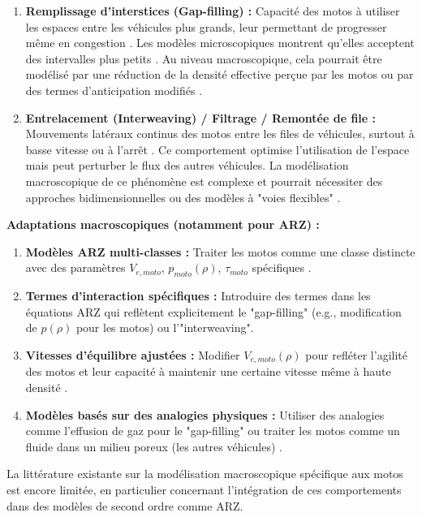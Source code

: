 \begin{enumerate}
    \item \textbf{Remplissage d'interstices (Gap-filling) :} Capacité des motos à utiliser les espaces entre les véhicules plus grands, leur permettant de progresser même en congestion \cite{khan2021macroscopic}. Les modèles microscopiques montrent qu'elles acceptent des intervalles plus petits \cite{NguyenEtAl2012}. Au niveau macroscopique, cela pourrait être modélisé par une réduction de la densité effective perçue par les motos ou par des termes d'anticipation modifiés \cite{khan2021macroscopic}.
    \item \textbf{Entrelacement (Interweaving) / Filtrage / Remontée de file :} Mouvements latéraux continus des motos entre les files de véhicules, surtout à basse vitesse ou à l'arrêt \cite{DiFrancescoEtAl2015, TiwariEtAl2007}. Ce comportement optimise l'utilisation de l'espace mais peut perturber le flux des autres véhicules. La modélisation macroscopique de ce phénomène est complexe et pourrait nécessiter des approches bidimensionnelles ou des modèles à "voies flexibles" \cite{ColomboMarcelliniRossi2023}.
\end{enumerate}

\textbf{Adaptations macroscopiques (notamment pour ARZ) :}

\begin{enumerate}
    \item \textbf{Modèles ARZ multi-classes :} Traiter les motos comme une classe distincte avec des paramètres $V_{e,moto}$, $p_{moto}(\rho)$, $\tau_{moto}$ spécifiques \cite{FanWork2015}.
    \item \textbf{Termes d'interaction spécifiques :} Introduire des termes dans les équations ARZ qui reflètent explicitement le "gap-filling" (e.g., modification de $p(\rho)$ pour les motos) ou l'"interweaving".
    \item \textbf{Vitesses d'équilibre ajustées :} Modifier $V_{e,moto}(\rho)$ pour refléter l'agilité des motos et leur capacité à maintenir une certaine vitesse même à haute densité \cite{TiwariEtAl2007}.
    \item \textbf{Modèles basés sur des analogies physiques :} Utiliser des analogies comme l'effusion de gaz pour le "gap-filling" \cite{khan2021macroscopic} ou traiter les motos comme un fluide dans un milieu poreux (les autres véhicules) \cite{khan2021macroscopic}.
\end{enumerate}

La littérature existante sur la modélisation macroscopique spécifique aux motos est encore limitée, en particulier concernant l'intégration de ces comportements dans des modèles de second ordre comme ARZ.

